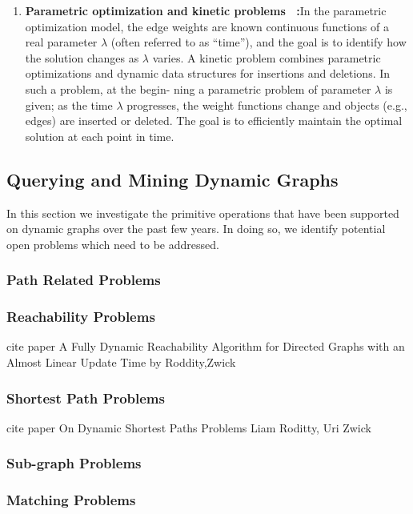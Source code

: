 \begin{enumerate}
	\item {\textbf{Parametric optimization and kinetic problems~\cite{agarwal1998parametric} :}}In the parametric optimization model, the edge weights are known continuous functions of a real parameter $\lambda$ (often referred to as “time”), and the goal is to identify how the solution changes as $\lambda$ varies. A kinetic problem combines parametric optimizations and dynamic data structures for insertions and deletions. In such a problem, at the begin- ning a parametric problem of parameter $\lambda$ is given; as the time $\lambda$ progresses, the weight functions change and objects (e.g., edges) are inserted or deleted. The goal is to efficiently maintain the optimal solution at each point in time.


\end{enumerate}



\subsection{Querying and Mining Dynamic Graphs}
\label{sec:query-mining}

In this section we investigate the primitive operations that have been supported on dynamic graphs over the past few years. In doing so, we identify potential open problems which need to be addressed. 


\subsubsection{Path Related Problems} 
\label{sec:path-problems}
\subsubsection {Reachability Problems}
cite paper A Fully Dynamic Reachability Algorithm for Directed Graphs with an Almost Linear Update Time by Roddity,Zwick
\subsubsection {Shortest Path Problems}
cite paper On Dynamic Shortest Paths Problems
Liam Roditty, Uri Zwick

\subsubsection{Sub-graph Problems}
\label{sec:subgraph-problems}


\subsubsection{Matching Problems}
\label{sec:matching-problems}


